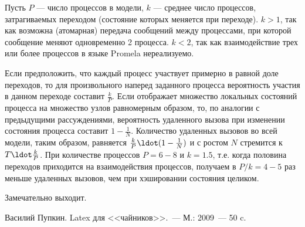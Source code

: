 \documentclass[utf8]{G7-32}
\begin{document}
Пусть $P$ — число процессов в модели, $k$ — среднее число процессов,
затрагиваемых переходом (состояние которых меняется при переходе). $k
> 1$, так как возможна (атомарная) передача сообщений между
процессами, при которой сообщение меняют одновременно 2 процесса. $k <
2$, так как взаимодействие трех или более процессов в языке Promela
нереализуемо.

Если предположить, что каждый процесс участвует примерно в равной доле
переходов, то для произвольного наперед заданного процесса вероятность
участия в данном переходе составит $\frac{k}{P}$. Если
 отображает множество локальных состояний процесса на
множество узлов равномерным образом, то, по аналогии с предыдущими
рассуждениями, вероятность удаленного вызова при изменении состояния
процесса составит $1 - \frac{1}{N}$. Количество удаленных вызовов во
всей модели, таким образом, равняется $\frac{k}{P} \ldot (1 -
\frac{1}{N})$ и с ростом $N$ стремится к $T \ldot \frac{k}{P}$. При
количестве процессов $P = 6-8$ и $k = 1.5$, т.е. когда половина переходов
приходится на взаимодействия процессов, получаем в $P/k = 4-5$ раз
меньше удаленных вызовов, чем при хэшировании состояния целиком.

\backmatter

\Conclusion

Замечательно выходит.

\begin{thebibliography}{99}
 Василий Пупкин. Latex для <<чайников>>.~--- М.: 2009~--- 50 c.
\end{thebibliography}
\end{document}
